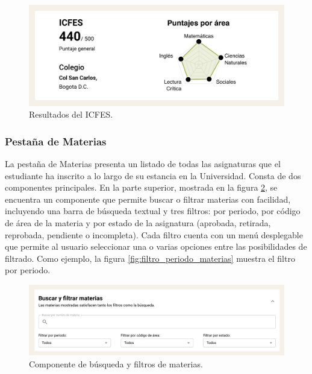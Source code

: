 \begin{figure}[H]
	\centering
	\includegraphics[width=\textwidth]{assets/nes/icfes.png}
	\caption{Resultados del ICFES.}
	\label{fig:icfes}
\end{figure}

\subsubsection{Pestaña de Materias}

La pestaña de Materias presenta un listado de todas las asignaturas que el estudiante ha inscrito a lo largo de su estancia en la Universidad. Consta de dos componentes principales. En la parte superior, mostrada en la figura \ref{fig:filtros_materias}, se encuentra un componente que permite buscar o filtrar materias con facilidad, incluyendo una barra de búsqueda textual y tres filtros: por periodo, por código de área de la materia y por estado de la asignatura (aprobada, retirada, reprobada, pendiente o incompleta). Cada filtro cuenta con un menú desplegable que permite al usuario seleccionar una o varias opciones entre las posibilidades de filtrado. Como ejemplo, la figura \ref{fig:filtro_periodo_materias} muestra el filtro por periodo.

\begin{figure}[H]
	\centering
	\includegraphics[width=\textwidth]{assets/nes/filtros_materias.png}
	\caption{Componente de búsqueda y filtros de materias.}
	\label{fig:filtros_materias}
\end{figure}

